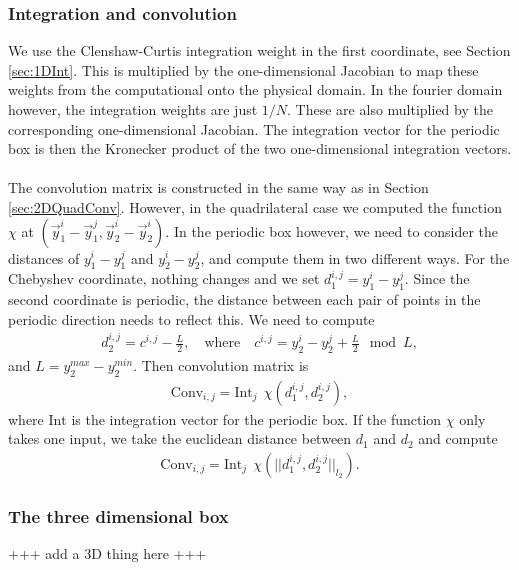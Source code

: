 \subsubsection*{Integration and convolution}
We use the Clenshaw-Curtis integration weight in the first coordinate, see Section \ref{sec:1DInt}. This is multiplied by the one-dimensional Jacobian to map these weights from the computational onto the physical domain. In the fourier domain however, the integration weights are just $1/N$. These are also multiplied by the corresponding one-dimensional Jacobian. The integration vector for the periodic box is then the Kronecker product of the two one-dimensional integration vectors.
\\
\\
The convolution matrix is constructed in the same way as in Section \ref{sec:2DQuadConv}. However, in the quadrilateral case we computed the function $\chi$ at $\left(\vec {y}_1^{i} - \vec {y}_1^{j}, \vec{y}_2^{i} - \vec {y}_2^{i} \right)$. In the periodic box however, we need to consider the distances of ${y}_1^{i} - {y}_1^{j}$ and ${y}_2^{i} - {y}_2^{j}$, and compute them in two different ways. For the Chebyshev coordinate, nothing changes and we set $d_1^{i,j} = {y}_1^{i} - {y}_1^{j}$. Since the second coordinate is periodic, the distance between each pair of points in the periodic direction needs to reflect this. We need to compute 
\begin{align*}	
	d_2^{i,j} = c^{i,j} - \frac{L}{2}, \quad \text{where} \quad c^{i,j} =  {y}_2^{i} - {y}_2^{j} + \frac{L}{2} \mod L,
\end{align*}
and $L = y_2^{max} - y_2^{min}$. 
Then convolution matrix is
\begin{align*}
	\text{Conv}_{i,j} = \text{Int}_j \ \ \chi(d_1^{i,j}, d_2^{i,j}),
\end{align*}
where $\text{Int}$ is the integration vector for the periodic box.
If the function $\chi$ only takes one input, we take the euclidean distance between $d_1$ and $d_2$ and compute
\begin{align*}
	\text{Conv}_{i,j} = \text{Int}_j \ \ \chi(||d_1^{i,j}, d_2^{i,j}||_{l_2}).
\end{align*}


\subsubsection{The three dimensional box}
+++ add a 3D thing here +++


